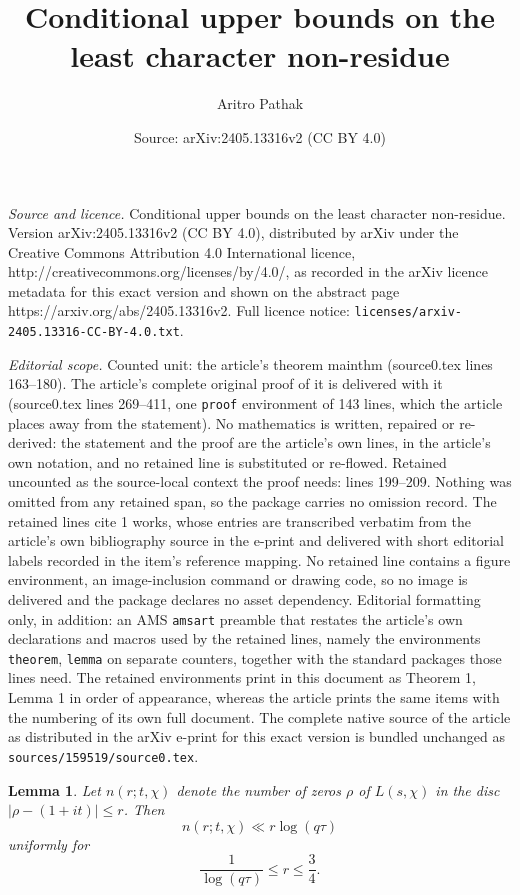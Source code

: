 \documentclass[10pt,a4paper]{amsart}
\title{Conditional upper bounds on the least character non-residue}
\author{Aritro Pathak}
\date{Source: arXiv:2405.13316v2 (CC BY 4.0)}
\newtheorem{lemma}{Lemma}
\begin{document}
\maketitle

\noindent\emph{Source and licence.} Conditional upper bounds on the least character non-residue. Version arXiv:2405.13316v2 (CC BY 4.0), distributed by arXiv under the Creative Commons Attribution 4.0 International licence, http://creativecommons.org/licenses/by/4.0/, as recorded in the arXiv licence metadata for this exact version and shown on the abstract page https://arxiv.org/abs/2405.13316v2. Full licence notice: \texttt{licenses/arxiv-2405.13316-CC-BY-4.0.txt}.\par\smallskip

\noindent\textit{Editorial scope.} Counted unit: the article's theorem mainthm (source0.tex lines 163--180). The article's complete original proof of it is delivered with it (source0.tex lines 269--411, one \texttt{proof} environment of 143 lines, which the article places away from the statement). No mathematics is written, repaired or re-derived: the statement and the proof are the article's own lines, in the article's own notation, and no retained line is substituted or re-flowed.  Retained uncounted as the source-local context the proof needs: lines 199--209.  Nothing was omitted from any retained span, so the package carries no omission record.  The retained lines cite 1 works, whose entries are transcribed verbatim from the article's own bibliography source in the e-print and delivered with short editorial labels recorded in the item's reference mapping.  No retained line contains a figure environment, an image-inclusion command or drawing code, so no image is delivered and the package declares no asset dependency.  Editorial formatting only, in addition: an AMS \texttt{amsart} preamble that restates the article's own declarations and macros used by the retained lines, namely the environments \texttt{theorem}, \texttt{lemma} on separate counters, together with the standard packages those lines need.  The retained environments print in this document as Theorem 1, Lemma 1 in order of appearance, whereas the article prints the same items with the numbering of its own full document.  The complete native source of the article as distributed in the arXiv e-print for this exact version is bundled unchanged as \texttt{sources/159519/source0.tex}.
\begin{lemma}\label{lemma}
    Let $n(r;t,\chi)$ denote the number of zeros $\rho$ of $L(s,\chi)$ in the disc 
$|\rho-(1+it)|\le r$. Then
\[
n(r;t,\chi)\ll r\log(q\tau)
\]
uniformly for
\[
\frac{1}{\log(q\tau)} \le r \le \frac{3}{4}.
\]
\end{lemma}
\end{document}
